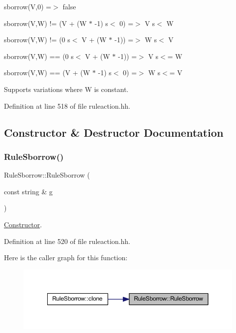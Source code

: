 \begin{DoxyItemize}
\item {\ttfamily sborrow(\+V,0) =$>$ false}
\item {\ttfamily sborrow(\+V,\+W) != (V + (W $\ast$ -\/1) s$<$ 0) =$>$ V s$<$ W}
\item {\ttfamily sborrow(\+V,\+W) != (0 s$<$ V + (W $\ast$ -\/1)) =$>$ W s$<$ V}
\item {\ttfamily sborrow(\+V,\+W) == (0 s$<$ V + (W $\ast$ -\/1)) =$>$ V s$<$= W}
\item {\ttfamily sborrow(\+V,\+W) == (V + (W $\ast$ -\/1) s$<$ 0) =$>$ W s$<$= V}
\end{DoxyItemize}

Supports variations where W is constant. 

Definition at line 518 of file ruleaction.\+hh.



\subsection{Constructor \& Destructor Documentation}
\mbox{\label{class_rule_sborrow_a02d96329d57e19d62f5db86e90254cac}} 
\subsubsection{\texorpdfstring{RuleSborrow()}{RuleSborrow()}}
{\footnotesize\ttfamily Rule\+Sborrow\+::\+Rule\+Sborrow (\begin{DoxyParamCaption}\item[{const string \&}]{g }\end{DoxyParamCaption})\hspace{0.3cm}{\ttfamily [inline]}}



\mbox{\hyperlink{class_constructor}{Constructor}}. 



Definition at line 520 of file ruleaction.\+hh.

Here is the caller graph for this function\+:
\nopagebreak
\begin{figure}[H]
\begin{center}
\leavevmode
\includegraphics[width=349pt]{class_rule_sborrow_a02d96329d57e19d62f5db86e90254cac_icgraph}
\end{center}
\end{figure}


